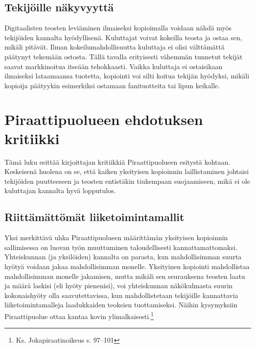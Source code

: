 \documentclass[titlepage,12pt]{article}
\begin{document}
\subsection{Tekijöille näkyvyyttä}

Digitaalisten teosten leviäminen ilmaiseksi kopioimalla voidaan nähdä
myös tekijöiden kannalta hyödyllisenä.  Kuluttajat voivat kokeilla
teosta ja ostaa sen, mikäli pitävät.  Ilman kokeilumahdollisuutta
kuluttaja ei olisi välttämättä päätynyt tekemään ostosta.  Tällä
tavalla erityisesti vähemmän tunnetut tekijät saavat markkinoitua
itseään tehokkaasti.  Vaikka kuluttaja ei ostaisikaan ilmaiseksi
lataamaansa tuotetta, kopiointi voi silti koitua tekijän hyödyksi,
mikäli kopioija päätyykin esimerkiksi ostamaan fanituotteita tai lipun
keikalle.


\section{Piraattipuolueen ehdotuksen kritiikki}

Tämä luku esittää kirjoittajan kritiikkiä Piraattipuolueen esitystä
kohtaan.  Keskeisenä huolena on se, että kaiken yksityisen kopioinnin
laillistaminen johtaisi tekijöiden puutteeseen ja teosten entistäkin
tiukempaan suojaamiseen, mikä ei ole kuluttajan kannalta hyvä
lopputulos.

\subsection{Riittämättömät liiketoimintamallit}

Yksi merkittävä uhka Piraattipuolueen määrittämän yksityisen
kopioinnin sallimisessa on luovan työn muuttuminen taloudellisesti
kannattamattomaksi.  Yhteiskunnan (ja yksilöiden) kannalta on parasta,
kun mahdollisimman suurta hyötyä voidaan jakaa mahdollisimman monelle.
Yksityinen kopiointi mahdollistaa mahdollisimman monelle jakamisen,
mutta mikäli sen seurauksena teosten laatu ja määrä laskisi (eli hyöty
pienenisi), voi yhteiskunnan näkökulmasta suurin kokonaishyöty olla
saavutettavissa, kun mahdollistetaan tekijöille kannattavia
liiketoimintamalleja laadukkaiden teoksien tuottamiseksi.  Näihin
kysymyksiin Piraattipuolue ottaa kantaa kovin
ylimalkaisesti.\footnote{Ks. Jokapiraatinoikeus s. 97--101}

\end{document}
